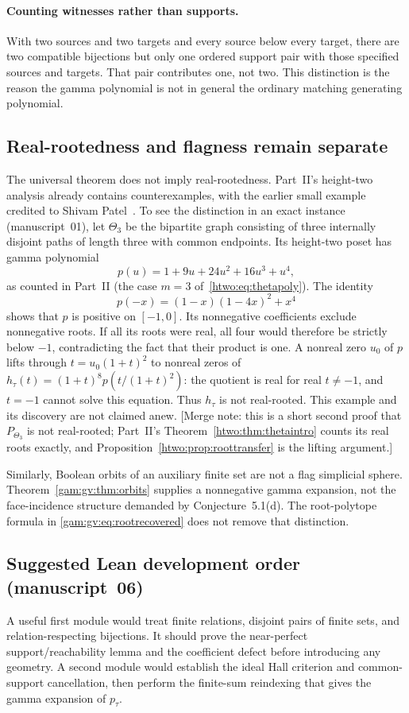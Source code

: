 \documentclass[11pt]{article}
\numberwithin{equation}{section}
\theoremstyle{definition}
\begin{document}
\paragraph{Counting witnesses rather than supports.}
With two sources and two targets and every source below every target,
there are two compatible bijections but only one ordered support pair with
those specified sources and targets. That pair contributes one, not two.
This distinction is the reason the gamma polynomial is not in general the
ordinary matching generating polynomial.

\subsection{Real-rootedness and flagness remain separate}
The universal theorem does not imply real-rootedness. Part~II's height-two
analysis already contains counterexamples, with the earlier small example
credited to Shivam Patel~\cite{Patel}. To see the distinction in an exact
instance (manuscript~01), let $\Theta_3$ be the bipartite graph consisting
of three internally disjoint paths of length three with common endpoints.
Its height-two poset has gamma polynomial
\[
 p(u)=1+9u+24u^2+16u^3+u^4,
\]
as counted in Part~II (the case $m=3$ of~\eqref{htwo:eq:thetapoly}). The
identity
\[
 p(-x)=(1-x)(1-4x)^2+x^4
\]
shows that $p$ is positive on $[-1,0]$. Its nonnegative coefficients exclude
nonnegative roots. If all its roots were real, all four would therefore be
strictly below $-1$, contradicting the fact that their product is one.
A nonreal zero $u_0$ of $p$ lifts through $t=u_0(1+t)^2$ to nonreal
zeros of $h_\tau(t)=(1+t)^8p(t/(1+t)^2)$: the quotient is real for real
$t\ne-1$, and $t=-1$ cannot solve this equation. Thus $h_\tau$ is not
real-rooted. This example and its discovery are not claimed anew. [Merge
note: this is a short second proof that $P_{\Theta_3}$ is not real-rooted;
Part~II's Theorem~\ref{htwo:thm:thetaintro} counts its real roots exactly,
and Proposition~\ref{htwo:prop:roottransfer} is the lifting argument.]

Similarly, Boolean orbits of an auxiliary finite set are not a flag
simplicial sphere. Theorem~\ref{gam:gv:thm:orbits} supplies a nonnegative gamma
expansion, not the face-incidence structure demanded by
Conjecture~5.1(d). The root-polytope formula in
\eqref{gam:gv:eq:rootrecovered} does not remove that distinction.

\subsection{Suggested Lean development order (manuscript~06)}
A useful first module would treat finite relations, disjoint pairs of finite
sets, and relation-respecting bijections. It should prove the near-perfect
support/reachability lemma and the coefficient defect before introducing
any geometry. A second module would establish the ideal Hall criterion and
common-support cancellation, then perform the finite-sum reindexing that
gives the gamma expansion of $p_\tau$.
\end{document}
